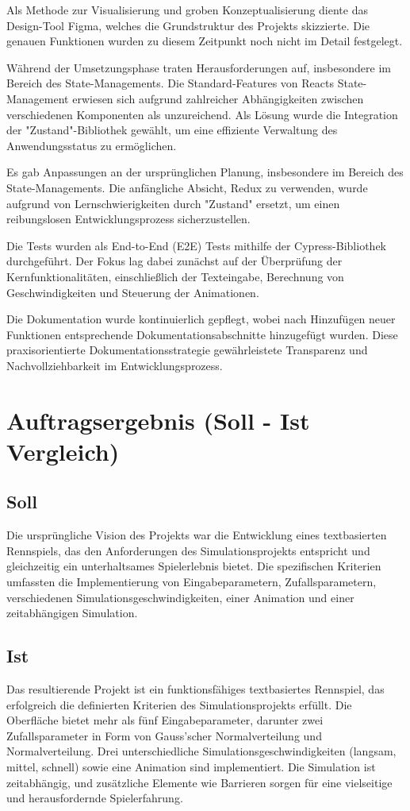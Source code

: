 \documentclass[hidelinks,12pt]{article}
\begin{document}
Als Methode zur Visualisierung und groben Konzeptualisierung diente das Design-Tool Figma, welches die Grundstruktur des Projekts skizzierte. Die genauen Funktionen wurden zu diesem Zeitpunkt noch nicht im Detail festgelegt.

Während der Umsetzungsphase traten Herausforderungen auf, insbesondere im Bereich des State-Managements. Die Standard-Features von Reacts State-Management erwiesen sich aufgrund zahlreicher Abhängigkeiten zwischen verschiedenen Komponenten als unzureichend. Als Lösung wurde die Integration der "Zustand"-Bibliothek gewählt, um eine effiziente Verwaltung des Anwendungsstatus zu ermöglichen.

Es gab Anpassungen an der ursprünglichen Planung, insbesondere im Bereich des State-Managements. Die anfängliche Absicht, Redux zu verwenden, wurde aufgrund von Lernschwierigkeiten durch "Zustand" ersetzt, um einen reibungslosen Entwicklungsprozess sicherzustellen.

Die Tests wurden als End-to-End (E2E) Tests mithilfe der Cypress-Bibliothek durchgeführt. Der Fokus lag dabei zunächst auf der Überprüfung der Kernfunktionalitäten, einschließlich der Texteingabe, Berechnung von Geschwindigkeiten und Steuerung der Animationen.

Die Dokumentation wurde kontinuierlich gepflegt, wobei nach Hinzufügen neuer Funktionen entsprechende Dokumentationsabschnitte hinzugefügt wurden. Diese praxisorientierte Dokumentationsstrategie gewährleistete Transparenz und Nachvollziehbarkeit im Entwicklungsprozess.

\section{Auftragsergebnis (Soll - Ist Vergleich)}

\subsection{Soll}
Die ursprüngliche Vision des Projekts war die Entwicklung eines textbasierten Rennspiels, das den Anforderungen des Simulationsprojekts entspricht und gleichzeitig ein unterhaltsames Spielerlebnis bietet. Die spezifischen Kriterien umfassten die Implementierung von Eingabeparametern, Zufallsparametern, verschiedenen Simulationsgeschwindigkeiten, einer Animation und einer zeitabhängigen Simulation.

\subsection{Ist}
Das resultierende Projekt ist ein funktionsfähiges textbasiertes Rennspiel, das erfolgreich die definierten Kriterien des Simulationsprojekts erfüllt. Die Oberfläche bietet mehr als fünf Eingabeparameter, darunter zwei Zufallsparameter in Form von Gauss'scher Normalverteilung und Normalverteilung. Drei unterschiedliche Simulationsgeschwindigkeiten (langsam, mittel, schnell) sowie eine Animation sind implementiert. Die Simulation ist zeitabhängig, und zusätzliche Elemente wie Barrieren sorgen für eine vielseitige und herausfordernde Spielerfahrung.
\end{document}

